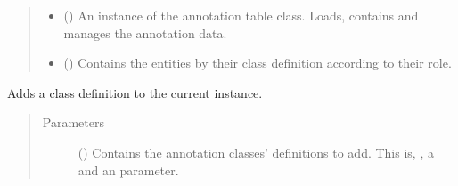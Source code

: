 \documentclass[letterpaper,10pt,english]{sphinxmanual}
\begin{document}
\begin{fulllineitems}
\begin{quote}
\begin{description}
\begin{itemize}
\item {} 
 () \textendash{} An instance of the annotation table class. Loads, contains and
manages the annotation data.

\item {} 
 () \textendash{} Contains the entities by their class definition according to
their role.

\end{itemize}

\end{description}\end{quote}

\begin{fulllineitems}
\label{\detokenize{reference:pypath.annot.CustomAnnotation.add_class_definitions}}
Adds a class definition to the current instance.
\begin{quote}\begin{description}
\item[{Parameters}] \leavevmode
{} () \textendash{} Contains the annotation classes’ definitions to add. This
is, , a  and an  parameter.

\end{description}\end{quote}

\end{fulllineitems}


\begin{fulllineitems}
\label{\detokenize{reference:pypath.annot.CustomAnnotation.classes_by_entity}}
\end{fulllineitems}


\end{fulllineitems}
\end{document}
